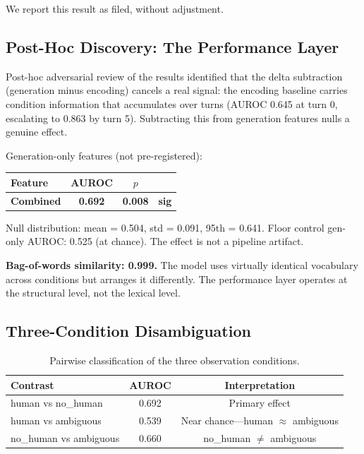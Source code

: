 \documentclass[11pt,a4paper]{article}
\begin{document}
We report this result as filed, without adjustment.

\subsection{Post-Hoc Discovery: The Performance Layer}

Post-hoc adversarial review of the results identified that the delta subtraction (generation minus encoding) cancels a real signal: the encoding baseline carries condition information that accumulates over turns (AUROC 0.645 at turn 0, escalating to 0.863 by turn 5). Subtracting this from generation features nulls a genuine effect.

Generation-only features (not pre-registered):

\begin{table}[H]
\centering
\begin{tabular}{lccc}
\toprule
Feature & AUROC & $p$ & \\
\midrule
\textbf{Combined} & \textbf{0.692} & \textbf{0.008} & \textbf{sig} \\
\bottomrule
\end{tabular}
\end{table}

Null distribution: mean = 0.504, std = 0.091, 95th = 0.641. Floor control gen-only AUROC: 0.525 (at chance). The effect is not a pipeline artifact.

\textbf{Bag-of-words similarity: 0.999.} The model uses virtually identical vocabulary across conditions but arranges it differently. The performance layer operates at the structural level, not the lexical level.

\subsection{Three-Condition Disambiguation}

\begin{table}[H]
\centering
\caption{Pairwise classification of the three observation conditions.}
\begin{tabular}{lcc}
\toprule
Contrast & AUROC & Interpretation \\
\midrule
human vs no\_human & 0.692 & Primary effect \\
human vs ambiguous & 0.539 & Near chance---human $\approx$ ambiguous \\
no\_human vs ambiguous & 0.660 & no\_human $\neq$ ambiguous \\
\bottomrule
\end{tabular}
\end{table}
\end{document}
